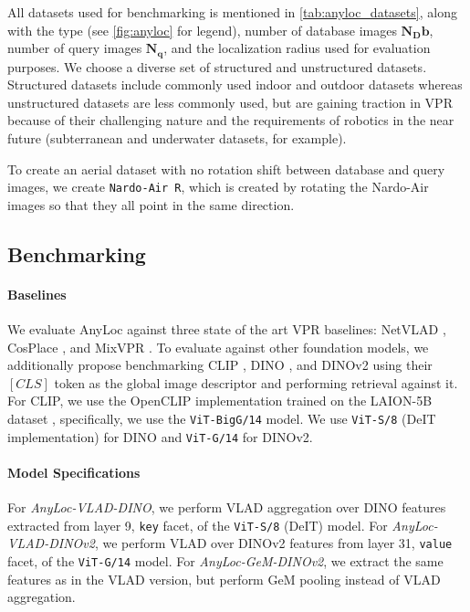 All datasets used for benchmarking is mentioned in
\cref{tab:anyloc_datasets}, along with the type (see \cref{fig:anyloc}
for legend), number of database images $\mathbf{N_Db}$, number of
query images $\mathbf{N_q}$, and the localization radius used for
evaluation purposes. We choose a diverse set of structured and
unstructured datasets. Structured datasets include commonly used
indoor and outdoor datasets whereas unstructured datasets are less
commonly used, but are gaining traction in VPR because of their
challenging nature and the requirements of robotics in the near future
(subterranean and underwater datasets, for example).

To create an aerial dataset with no rotation shift between database 
and query images, we create \texttt{Nardo-Air R}, which is created by
rotating the Nardo-Air images so that they all point in the same 
direction.

\subsection{Benchmarking}

\paragraph{Baselines}

We evaluate AnyLoc against three state of the art VPR baselines:
NetVLAD \cite{Arandjelovi2015NetVLADCA}, CosPlace
\cite{Berton2022RethinkingVG}, and MixVPR \cite{Alibey2023MixVPRFM}.
To evaluate against other foundation models, we additionally propose
benchmarking CLIP \cite{Radford2021LearningTV}, DINO
\cite{Caron2021EmergingPI}, and DINOv2 \cite{Oquab2023DINOv2LR} using
their $\left[CLS\right]$ token as the global image descriptor and
performing retrieval against it. For CLIP, we use the OpenCLIP
implementation trained on the LAION-5B dataset
\cite{Ilharco2021OpenCLIP, Cherti2023ReproducibleSL,
Radford2021LearningTV, Schuhmann2022LAION5BAO}, specifically, we use
the \texttt{ViT-BigG/14} model. We use \texttt{ViT-S/8} (DeIT
implementation) for DINO and \texttt{ViT-G/14} for DINOv2.

\paragraph{Model Specifications}

For \emph{AnyLoc-VLAD-DINO}, we perform VLAD aggregation over DINO
features extracted from layer 9, \texttt{key} facet, of the
\texttt{ViT-S/8} (DeIT) model. For \emph{AnyLoc-VLAD-DINOv2}, we
perform VLAD over DINOv2 features from layer 31, \texttt{value} facet,
of the \texttt{ViT-G/14} model. For \emph{AnyLoc-GeM-DINOv2}, we
extract the same features as in the VLAD version, but perform GeM
pooling instead of VLAD aggregation.

